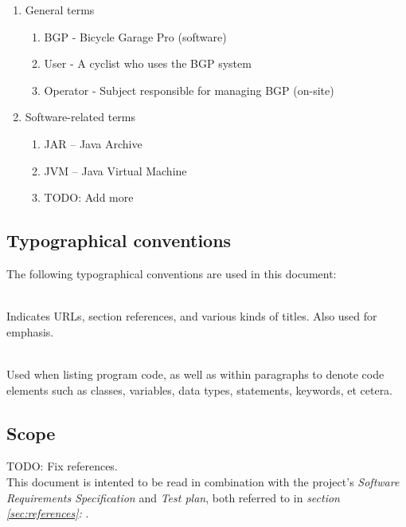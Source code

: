 \documentclass[12pt,titlepage]{article}
\begin{document}
\begin{enumerate}
	\item General terms
	\begin{enumerate}
		\item BGP - Bicycle Garage Pro (software)
		\item User - A cyclist who uses the BGP system
		\item Operator - Subject responsible for managing BGP (on-site)
	\end{enumerate}
	\item Software-related terms
	\begin{enumerate}
		\item JAR -- Java Archive
		\item JVM -- Java Virtual Machine
		\item TODO: Add more
	\end{enumerate}
\end{enumerate}

\subsection{Typographical conventions}
\label{subsec:introduction-typographical-conventions}

The following typographical conventions are used in this document:

\begin{description}[font=\normalfont]
	\item[\textit{Italic}] \hfill \\
		Indicates URLs, section references, and various kinds of titles.
		Also used for emphasis.
	\item[\texttt{Constant width}] \hfill \\
		Used when listing program code, as well as within paragraphs to
		denote code elements such as classes, variables, data types,
		statements, keywords, et cetera.
\end{description}

\subsection{Scope}
\label{subsec:introduction-scope}

TODO: Fix references. \\

This document is intented to be read in combination with the project's
\textit{Software Requirements Specification} and \textit{Test plan}, both
referred to in \textit{section \ref{sec:references}: }.
\end{document}
